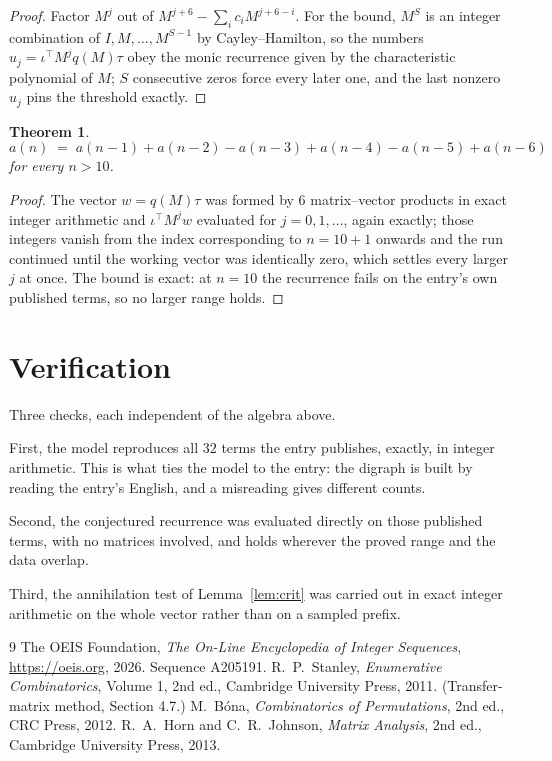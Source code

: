 \documentclass[11pt,a4paper]{article}
\theoremstyle{plain}
\newtheorem{theorem}{Theorem}
\theoremstyle{definition}
\begin{document}
\begin{proof}
Factor $M^{j}$ out of $M^{j+6}-\sum_ic_iM^{j+6-i}$. For the bound, $M^{S}$
is an integer combination of $I,M,\dots,M^{S-1}$ by Cayley--Hamilton, so the numbers
$u_j=\iota^{\!\top}M^{j}q(M)\tau$ obey the monic recurrence given by the characteristic
polynomial of $M$; $S$ consecutive zeros force every later one, and the last nonzero $u_j$
pins the threshold exactly.
\end{proof}

\begin{theorem}
\[
a(n)\;=\;a(n-1) + a(n-2) - a(n-3) + a(n-4) - a(n-5) + a(n-6)
\]
for every $n>10$.
\end{theorem}

\begin{proof}
The vector $w=q(M)\tau$ was formed by $6$ matrix--vector products in exact integer
arithmetic and $\iota^{\!\top}M^{j}w$ evaluated for $j=0,1,\dots$, again exactly; those
integers vanish from the index corresponding to $n=10+1$ onwards and the run continued
until the working vector was identically zero, which settles every larger $j$ at once. The bound is exact: at $n=10$ the recurrence fails on the entry's own published terms, so no larger range holds.
\end{proof}

\section{Verification}

Three checks, each independent of the algebra above.

First, the model reproduces all $32$ terms the entry publishes, exactly, in integer
arithmetic. This is what ties the model to the entry: the digraph is built by reading the
entry's English, and a misreading gives different counts.

Second, the conjectured recurrence was evaluated directly on those published terms, with no
matrices involved, and holds wherever the proved range and the data overlap.

Third, the annihilation test of Lemma~\ref{lem:crit} was carried out in exact integer
arithmetic on the whole vector rather than on a sampled prefix.

\begin{thebibliography}{9}
 The OEIS Foundation, \emph{The On-Line Encyclopedia of Integer
Sequences}, \url{https://oeis.org}, 2026. Sequence A205191.
 R.~P.~Stanley, \emph{Enumerative Combinatorics}, Volume 1, 2nd ed.,
Cambridge University Press, 2011. (Transfer-matrix method, Section 4.7.)
 M.~B\'ona, \emph{Combinatorics of Permutations}, 2nd ed., CRC
Press, 2012.
 R.~A.~Horn and C.~R.~Johnson, \emph{Matrix Analysis}, 2nd ed., Cambridge
University Press, 2013.
\end{thebibliography}
\end{document}
